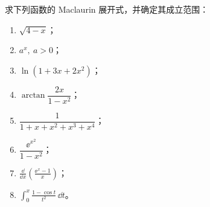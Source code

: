 \begin{xexercise}[5]
求下列函数的 Maclaurin 展开式，并确定其成立范围：
  \begin{enumerate}[label=(\arabic*)]
    \item $\sqrt{4-x}$；
    \item $a^x,\ a>0$；
    \item $\ln(1+3x+2x^2)$；
    \item $\arctan\dfrac{2x}{1-x^2}$；
    \item $\dfrac1{1+x+x^2+x^3+x^4}$；
    \item $\dfrac{\ee^{x^2}}{1-x^2}$；
    \item $\displaystyle\frac{\dd}{\dd x}\left(\frac{\ee^x-1}{x}\right)$；
    \item $\displaystyle\int_0^x\frac{1-\cos t}{t^2}\,\dd t$。
  \end{enumerate}
\end{xexercise}
